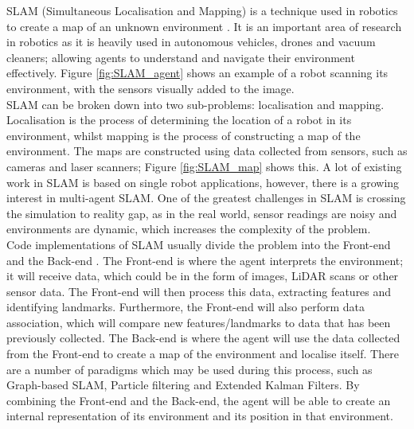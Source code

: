 \documentclass[12pt]{article}
\begin{document}
SLAM (Simultaneous Localisation and Mapping) is a technique used in robotics to create a map of an unknown environment \cite{SLAM_overview}.
It is an important area of research in robotics as it is heavily used in autonomous vehicles, drones and vacuum cleaners;
allowing agents to understand and navigate their environment effectively. Figure \ref{fig:SLAM_agent} shows an example of a
robot scanning its environment, with the sensors visually added to the image.\\
SLAM can be broken down into two sub-problems: localisation and mapping. Localisation is the process of determining the
location of a robot in its environment, whilst mapping is the process of constructing a map of the environment. The maps
are constructed using data collected from sensors, such as cameras and laser scanners; Figure \ref{fig:SLAM_map} shows this.
A lot of existing work in SLAM is based on single robot applications, however, there is a growing interest in multi-agent
SLAM. One of the greatest challenges in SLAM is crossing the simulation to reality gap, as in the real world, sensor
readings are noisy and environments are dynamic, which increases the complexity of the problem.\\
Code implementations of SLAM usually divide the problem into the Front-end and the Back-end \cite{SLAM_components}.
The Front-end is where the agent interprets the environment; it will receive data, which could be in the form of images,
LiDAR scans or other sensor data. The Front-end will then process this data, extracting features and identifying landmarks.
Furthermore, the Front-end will also perform data association, which will compare new features/landmarks to data that has
been previously collected. The Back-end is where the agent will use the data collected from the Front-end to create a map
of the environment and localise itself. There are a number of paradigms which may be used during this process, such as Graph-based
SLAM, Particle filtering and Extended Kalman Filters. By combining the Front-end and the Back-end, the agent will be able to
create an internal representation of its environment and its position in that environment.
\end{document}
